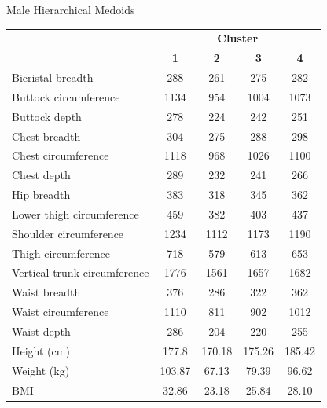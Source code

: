 \documentclass[10pt]{beamer}
\begin{document}
\begin{frame}{Male Hierarchical Medoids}
	\scriptsize
	\centering
	\begin{tabular}{lcccc}
		\cline{2-5}
		                             & \multicolumn{4}{c}{\textbf{Cluster}}                                        \\
		                             & \textbf{1}                           & \textbf{2} & \textbf{3} & \textbf{4} \\
		\hline\hline
		Bicristal breadth            & 288                                  & 261        & 275        & 282        \\
		Buttock circumference        & 1134                                 & 954        & 1004       & 1073       \\
		Buttock depth                & 278                                  & 224        & 242        & 251        \\
		Chest breadth                & 304                                  & 275        & 288        & 298        \\
		Chest circumference          & 1118                                 & 968        & 1026       & 1100       \\
		Chest depth                  & 289                                  & 232        & 241        & 266        \\
		Hip breadth                  & 383                                  & 318        & 345        & 362        \\
		Lower thigh circumference    & 459                                  & 382        & 403        & 437        \\
		Shoulder circumference       & 1234                                 & 1112       & 1173       & 1190       \\
		Thigh circumference          & 718                                  & 579        & 613        & 653        \\
		Vertical trunk circumference & 1776                                 & 1561       & 1657       & 1682       \\
		Waist breadth                & 376                                  & 286        & 322        & 362        \\
		Waist circumference          & 1110                                 & 811        & 902        & 1012       \\
		Waist depth                  & 286                                  & 204        & 220        & 255        \\
		\hline
		Height (cm)                  & 177.8                                & 170.18     & 175.26     & 185.42     \\
		Weight (kg)                  & 103.87                               & 67.13      & 79.39      & 96.62      \\
		BMI                          & 32.86                                & 23.18      & 25.84      & 28.10
	\end{tabular}
\end{frame}
\end{document}
